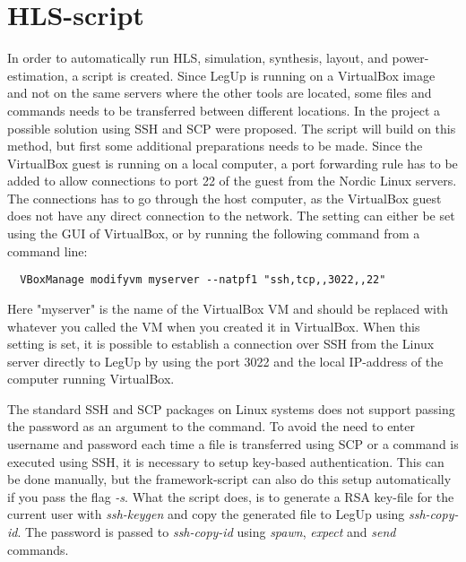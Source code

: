 \section{HLS-script}
In order to automatically run HLS, simulation, synthesis, layout, and power-estimation, a script is created. Since LegUp is running on a VirtualBox image and not on the same servers where the other tools are located, some files and commands needs to be transferred between different locations. In the project \cite{holm2015pro} a possible solution using SSH and SCP were proposed. The script will build on this method, but first some additional preparations needs to be made. Since the VirtualBox guest is running on a local computer, a port forwarding rule has to be added to allow connections to port 22 of the guest from the Nordic Linux servers. The connections has to go through the host computer, as the VirtualBox guest does not have any direct connection to the network. The setting can either be set using the GUI of VirtualBox, or by running the following command from a command line:
\begin{verbatim}
  VBoxManage modifyvm myserver --natpf1 "ssh,tcp,,3022,,22"  
\end{verbatim}
Here "myserver" is the name of the VirtualBox VM and should be replaced with whatever you called the VM when you created it in VirtualBox. When this setting is set, it is possible to establish a connection over SSH from the Linux server directly to LegUp by using the port 3022 and the local IP-address of the computer running VirtualBox.

The standard SSH and SCP packages on Linux systems does not support passing the password as an argument to the command. To avoid the need to enter username and password each time a file is transferred using SCP or a command is executed using SSH, it is necessary to setup key-based authentication. This can be done manually, but the framework-script can also do this setup automatically if you pass the flag \textit{-s}. What the script does, is to generate a RSA key-file for the current user with \textit{ssh-keygen} and copy the generated file to LegUp using \textit{ssh-copy-id}. The password is passed to \textit{ssh-copy-id} using \textit{spawn}, \textit{expect} and \textit{send} commands.

